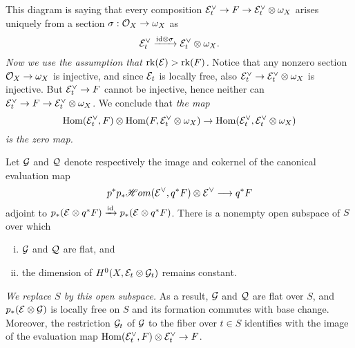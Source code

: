 \documentclass[letterpaper,12pt]{article}
\theoremstyle{remark}
\begin{document}
This diagram is saying that every composition $\mathcal{E}_t^\vee \to F \to \mathcal{E}_t^\vee \otimes \omega_X$ arises uniquely from a section $\sigma: \mathcal{O}_X \to \omega_X$ as 
\[ \mathcal{E}_t^\vee \xrightarrow{\mathrm{id} \otimes \sigma} \mathcal{E}_t^\vee \otimes \omega_X. \] 
\emph{Now we use the assumption that $\operatorname{\mathrm{rk}}(\mathcal{E}) > \operatorname{\mathrm{rk}}(F)$.} Notice that any nonzero section $\mathcal{O}_X \to \omega_X$ is injective, and since $\mathcal{E}_t$ is locally free, also $\mathcal{E}_t^\vee \to \mathcal{E}_t^\vee \otimes \omega_X$ is injective. But $\mathcal{E}_t^\vee \to F$ cannot be injective, hence neither can $\mathcal{E}_t^\vee \to F \to \mathcal{E}_t^\vee \otimes \omega_X$. We conclude that \emph{the map}
\[ \mathrm{Hom}(\mathcal{E}_t^\vee, F) \otimes \mathrm{Hom}(F, \mathcal{E}_t^\vee \otimes \omega_X) \to \mathrm{Hom}(\mathcal{E}_t^\vee, \mathcal{E}_t^\vee \otimes \omega_X) \]
\emph{is the zero map.}

Let $\mathcal{G}$ and $\mathcal{Q}$ denote respectively the image and cokernel of the canonical evaluation map
\[ p^*p_*\mathscr{H}om(\mathcal{E}^\vee, q^*F) \otimes \mathcal{E}^\vee \longrightarrow q^*F \]
adjoint to $p_*(\mathcal{E} \otimes q^*F) \xrightarrow{\mathrm{id}} p_*(\mathcal{E} \otimes q^*F)$. There is a nonempty open subspace of $S$ over which 
\begin{enumerate}[(i)]
    \item $\mathcal{G}$ and $\mathcal{Q}$ are flat, and
    \item the dimension of $H^0(X, \mathcal{E}_t \otimes \mathcal{G}_t)$ remains constant.
\end{enumerate} 
\emph{We replace $S$ by this open subspace.} As a result, $\mathcal{G}$ and $\mathcal{Q}$ are flat over $S$, and $p_*(\mathcal{E} \otimes \mathcal{G})$ is locally free on $S$ and its formation commutes with base change. Moreover, the restriction $\mathcal{G}_t$ of $\mathcal{G}$ to the fiber over $t \in S$ identifies with the image of the evaluation map $\mathrm{Hom}(\mathcal{E}_t^\vee, F) \otimes \mathcal{E}_t^\vee \to F$. 
\end{document}
